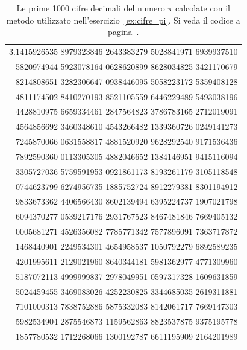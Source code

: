\begin{table}
\begin{center}
\begin{tabular}{r}
\ttfamily\footnotesize 3.1415926535 8979323846 2643383279 5028841971 6939937510 \\
\ttfamily\footnotesize   5820974944 5923078164 0628620899 8628034825 3421170679 \\
\ttfamily\footnotesize   8214808651 3282306647 0938446095 5058223172 5359408128 \\
\ttfamily\footnotesize   4811174502 8410270193 8521105559 6446229489 5493038196 \\
\ttfamily\footnotesize   4428810975 6659334461 2847564823 3786783165 2712019091 \\
\ttfamily\footnotesize   4564856692 3460348610 4543266482 1339360726 0249141273 \\
\ttfamily\footnotesize   7245870066 0631558817 4881520920 9628292540 9171536436 \\
\ttfamily\footnotesize   7892590360 0113305305 4882046652 1384146951 9415116094 \\
\ttfamily\footnotesize   3305727036 5759591953 0921861173 8193261179 3105118548 \\
\ttfamily\footnotesize   0744623799 6274956735 1885752724 8912279381 8301194912 \\
\ttfamily\footnotesize   9833673362 4406566430 8602139494 6395224737 1907021798 \\
\ttfamily\footnotesize   6094370277 0539217176 2931767523 8467481846 7669405132 \\
\ttfamily\footnotesize   0005681271 4526356082 7785771342 7577896091 7363717872 \\
\ttfamily\footnotesize   1468440901 2249534301 4654958537 1050792279 6892589235 \\
\ttfamily\footnotesize   4201995611 2129021960 8640344181 5981362977 4771309960 \\
\ttfamily\footnotesize   5187072113 4999999837 2978049951 0597317328 1609631859 \\
\ttfamily\footnotesize   5024459455 3469083026 4252230825 3344685035 2619311881 \\
\ttfamily\footnotesize   7101000313 7838752886 5875332083 8142061717 7669147303 \\
\ttfamily\footnotesize   5982534904 2875546873 1159562863 8823537875 9375195778 \\
\ttfamily\footnotesize   1857780532 1712268066 1300192787 6611195909 2164201989
\end{tabular}
\end{center}
\caption{Le prime 1000 cifre decimali del numero $\pi$
calcolate con il metodo utilizzato nell'esercizio~\ref{ex:cifre_pi}.
Si veda il codice a pagina~\pageref{code:compute_pi}.}
\label{tab:cifre_pi}
\end{table}

